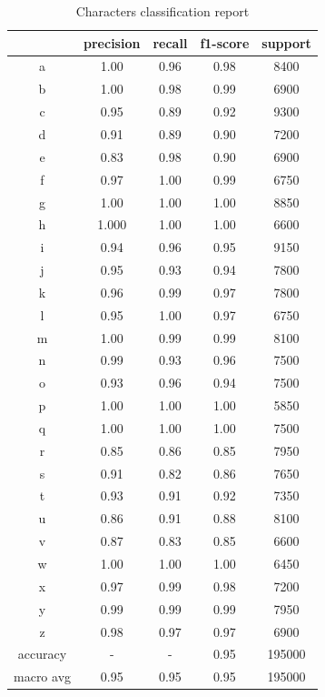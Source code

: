 \begin{table}[h]
	\centering
	\begin{tabular}{|c|c|c|c|c|}
		\hline
		& precision & recall & f1-score & support \\
		\hline
		a & 1.00 & 0.96 & 0.98 & 8400 \\
		\hline
		b& 1.00 & 0.98 & 0.99 & 6900 \\
		\hline
		c & 0.95 & 0.89 & 0.92 & 9300 \\
		\hline
		d & 0.91 & 0.89 & 0.90 & 7200 \\
		\hline
		e & 0.83 & 0.98 & 0.90 & 6900 \\
		\hline
		f & 0.97 & 1.00 & 0.99 & 6750 \\
		\hline
		g & 1.00 & 1.00 & 1.00 & 8850 \\
		\hline
		h & 1.000 & 1.00 & 1.00 & 6600 \\
		\hline
		i & 0.94 & 0.96 & 0.95 & 9150 \\
		\hline
		j & 0.95 & 0.93 & 0.94 & 7800 \\
		\hline
		k & 0.96 & 0.99 & 0.97 & 7800 \\
		\hline
		l & 0.95 & 1.00 & 0.97 & 6750 \\
		\hline
		m & 1.00 & 0.99 & 0.99 & 8100 \\
		\hline
		n & 0.99 & 0.93 & 0.96 & 7500 \\
		\hline
		o & 0.93 & 0.96 & 0.94 & 7500 \\
		\hline
		p & 1.00 & 1.00 & 1.00 & 5850 \\
		\hline
		q & 1.00 & 1.00 & 1.00 & 7500 \\
		\hline
		r & 0.85 & 0.86 & 0.85 & 7950 \\
		\hline
		s & 0.91 & 0.82 & 0.86 & 7650 \\
		\hline
		t & 0.93 & 0.91 & 0.92 & 7350 \\
		\hline
		u & 0.86 & 0.91 & 0.88 & 8100 \\
		\hline
		v & 0.87 & 0.83 & 0.85 & 6600 \\
		\hline
		w & 1.00 & 1.00 & 1.00 & 6450 \\
		\hline
		x & 0.97 & 0.99 & 0.98 & 7200 \\
		\hline
		y & 0.99 & 0.99 & 0.99 & 7950 \\
		\hline
		z & 0.98 & 0.97 & 0.97 & 6900 \\
		\hline
		accuracy & - & - & 0.95 & 195000 \\
		\hline
		macro avg & 0.95 & 0.95 & 0.95 & 195000 \\
		\hline
	\end{tabular}
	\caption{Characters classification report}
	\label{tab:characters_classification_report}
\end{table}